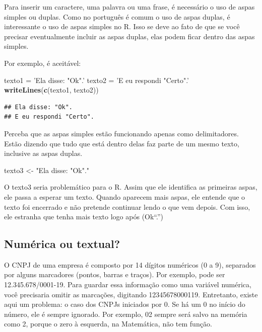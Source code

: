 \documentclass[
]{book}
\newenvironment{Shaded}{\begin{snugshade}}{\end{snugshade}}
\newcommand{\KeywordTok}[1]{\textcolor[rgb]{0.13,0.29,0.53}{\textbf{#1}}}
\newcommand{\NormalTok}[1]{#1}
\newcommand{\StringTok}[1]{\textcolor[rgb]{0.31,0.60,0.02}{#1}}
\begin{document}
Para inserir um caractere, uma palavra ou uma frase, é necessário o uso de aspas simples ou duplas. Como no português é comum o uso de aspas duplas, é interessante o uso de aspas simples no R. Isso se deve ao fato de que se você precisar eventualmente incluir as aspas duplas, elas podem ficar dentro das aspas simples.

Por exemplo, é aceitável:

\begin{Shaded}
\begin{Highlighting}[]
\NormalTok{texto1 =}\StringTok{ 'Ela disse: "Ok".'}
\NormalTok{texto2 =}\StringTok{ 'E eu respondi "Certo".'}
\KeywordTok{writeLines}\NormalTok{(}\KeywordTok{c}\NormalTok{(texto1, texto2))}
\end{Highlighting}
\end{Shaded}

\begin{verbatim}
## Ela disse: "Ok".
## E eu respondi "Certo".
\end{verbatim}

Perceba que as aspas simples estão funcionando apenas como delimitadores. Estão dizendo que tudo que está dentro delas faz parte de um mesmo texto, inclusive as aspas duplas.

\begin{Shaded}
\begin{Highlighting}[]
\NormalTok{texto3 <-}\StringTok{ "Ela disse: "}\NormalTok{Ok}\StringTok{"."}
\end{Highlighting}
\end{Shaded}

O texto3 seria problemático para o R. Assim que ele identifica as primeiras aspas, ele passa a esperar um texto. Quando aparecem mais aspas, ele entende que o texto foi encerrado e não pretende continuar lendo o que vem depois. Com isso, ele estranha que tenha mais texto logo após (Ok``.'')

\hypertarget{numuxe9rica-ou-textual}{%
\subsection{Numérica ou textual?}\label{numuxe9rica-ou-textual}}

O CNPJ de uma empresa é composto por 14 dígitos numéricos (0 a 9), separados por alguns marcadores (pontos, barras e traços). Por exemplo, pode ser 12.345.678/0001-19. Para guardar essa informação como uma variável numérica, você precisaria omitir as marcações, digitando 12345678000119. Entretanto, existe aqui um problema: o caso dos CNPJs iniciados por 0. Se há um 0 no início do número, ele é sempre ignorado. Por exemplo, 02 sempre será salvo na memória como 2, porque o zero à esquerda, na Matemática, não tem função.
\end{document}
